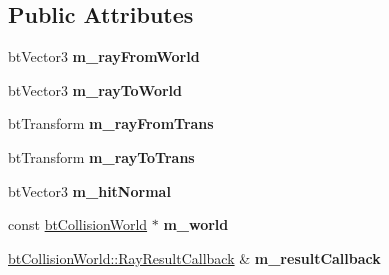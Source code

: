\subsection*{Public Attributes}
\begin{DoxyCompactItemize}
\item 
\hypertarget{structbt_single_ray_callback_ae2a8447720a8480dee07885530b7ac7d}{bt\+Vector3 {\bfseries m\+\_\+ray\+From\+World}}\label{structbt_single_ray_callback_ae2a8447720a8480dee07885530b7ac7d}

\item 
\hypertarget{structbt_single_ray_callback_a0228334519f7103b42fb0f6293e19de6}{bt\+Vector3 {\bfseries m\+\_\+ray\+To\+World}}\label{structbt_single_ray_callback_a0228334519f7103b42fb0f6293e19de6}

\item 
\hypertarget{structbt_single_ray_callback_a431584532d7b53e1464755e4e56faef0}{bt\+Transform {\bfseries m\+\_\+ray\+From\+Trans}}\label{structbt_single_ray_callback_a431584532d7b53e1464755e4e56faef0}

\item 
\hypertarget{structbt_single_ray_callback_a0b770d0ef3a7524db67241cc21529d21}{bt\+Transform {\bfseries m\+\_\+ray\+To\+Trans}}\label{structbt_single_ray_callback_a0b770d0ef3a7524db67241cc21529d21}

\item 
\hypertarget{structbt_single_ray_callback_a47949e35b0315a9b1a6d96c90b7fb41f}{bt\+Vector3 {\bfseries m\+\_\+hit\+Normal}}\label{structbt_single_ray_callback_a47949e35b0315a9b1a6d96c90b7fb41f}

\item 
\hypertarget{structbt_single_ray_callback_a04d7ba7a47c7e5dfa392dfcc8173ad6f}{const \hyperlink{classbt_collision_world}{bt\+Collision\+World} $\ast$ {\bfseries m\+\_\+world}}\label{structbt_single_ray_callback_a04d7ba7a47c7e5dfa392dfcc8173ad6f}

\item 
\hypertarget{structbt_single_ray_callback_ab2e53b27b67cf629c45c10750c4e74f4}{\hyperlink{structbt_collision_world_1_1_ray_result_callback}{bt\+Collision\+World\+::\+Ray\+Result\+Callback} \& {\bfseries m\+\_\+result\+Callback}}\label{structbt_single_ray_callback_ab2e53b27b67cf629c45c10750c4e74f4}

\end{DoxyCompactItemize}


